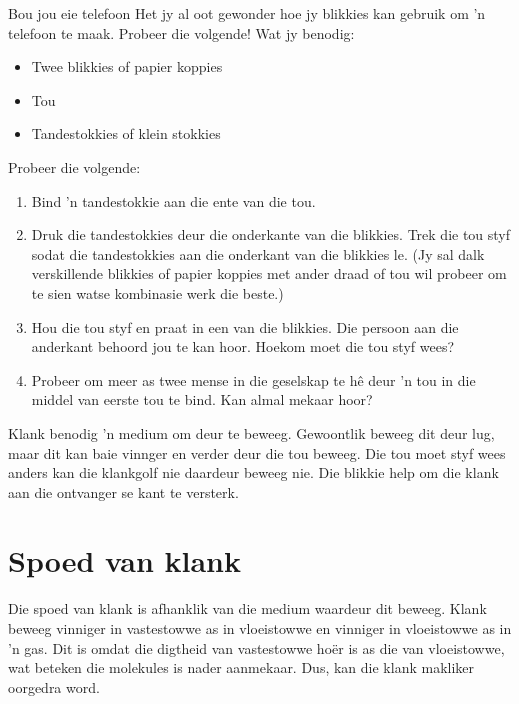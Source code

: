 	\par


\begin{activity}{Bou jou eie telefoon} 
Het jy al oot gewonder hoe jy blikkies kan gebruik om 'n telefoon te maak. Probeer die volgende!
Wat jy benodig:
\begin{itemize}
 \item Twee blikkies of papier koppies
  \item Tou
  \item Tandestokkies of klein stokkies
\end{itemize}

Probeer die volgende:
\begin{enumerate}[noitemsep, label=\textbf{\arabic*}. ] 
\item Bind 'n tandestokkie aan die ente van die tou. 
\item Druk die tandestokkies deur die onderkante van die blikkies. Trek die tou styf sodat die tandestokkies aan die onderkant van die blikkies le. (Jy sal dalk verskillende blikkies of papier koppies met ander draad of tou wil probeer om te sien watse kombinasie werk die beste.)
\item Hou die tou styf en praat in een van die blikkies. Die persoon aan die anderkant behoord jou te kan hoor. Hoekom moet die tou styf wees?
\item Probeer om meer as twee mense in die geselskap te h\^e deur 'n tou in die middel van eerste tou te bind. Kan almal mekaar hoor?
\end{enumerate}
Klank benodig 'n medium om deur te beweeg. Gewoontlik beweeg dit deur lug, maar dit kan baie vinnger en verder deur die tou beweeg. Die tou moet styf wees anders kan die klankgolf nie daardeur beweeg nie. Die blikkie help om die klank aan die ontvanger se kant te versterk.	
\end{activity}

    \label{m38799*cid3}
            \section{Spoed van klank}
            \nopagebreak
Die spoed van klank is afhanklik van die medium waardeur dit beweeg. Klank beweeg vinniger in vastestowwe as in vloeistowwe en vinniger in vloeistowwe as in 'n gas. Dit is omdat die digtheid van vastestowwe ho\"{e}r is as die van vloeistowwe, wat beteken die molekules is nader aanmekaar. Dus, kan die klank makliker oorgedra word.\par 

